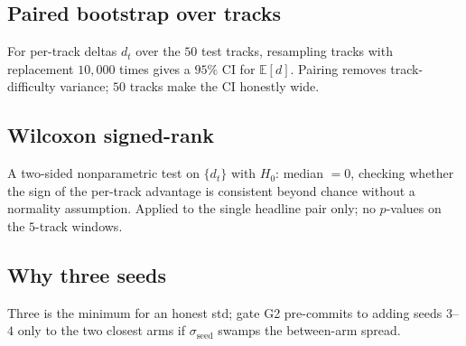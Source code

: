 \documentclass[11pt]{article}
\begin{document}
\subsection{Paired bootstrap over tracks}
For per-track deltas $d_t$ over the $50$ test tracks, resampling tracks with
replacement $10{,}000$ times gives a $95\%$ CI for $\mathbb E[d]$. Pairing
removes track-difficulty variance; $50$ tracks make the CI honestly wide.

\subsection{Wilcoxon signed-rank}
A two-sided nonparametric test on $\{d_t\}$ with $H_0$: median $=0$, checking
whether the sign of the per-track advantage is consistent beyond chance without a
normality assumption. Applied to the single headline pair only; no $p$-values on
the $5$-track windows.

\subsection{Why three seeds}
Three is the minimum for an honest std; gate G2 pre-commits to adding seeds
$3$--$4$ only to the two closest arms if $\sigma_{\mathrm{seed}}$ swamps the
between-arm spread.
\end{document}
